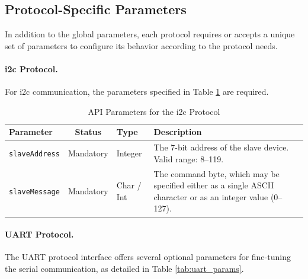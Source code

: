 \subsection{Protocol-Specific Parameters}
\label{subsec:protocol_params}

In addition to the global parameters, each protocol requires or accepts a unique set of parameters to configure its behavior according to the protocol needs.

\paragraph{\gls{i2c} Protocol.} For \gls{i2c} communication, the parameters specified in Table \ref{tab:i2c_params} are required.

\begin{table}[h!]
    \centering
    \caption{API Parameters for the \gls{i2c} Protocol}
    \label{tab:i2c_params}
    \begin{tabular}{|l|c|l|p{6cm}|}
        \hline
        \textbf{Parameter} & \textbf{Status} & \textbf{Type} & \textbf{Description} \\ \hline
        \texttt{slaveAddress} & Mandatory & Integer & The 7-bit address of the slave device. Valid range: 8–119. \\ \hline
        \texttt{slaveMessage} & Mandatory & Char / Int & The command byte, which may be specified either as a single ASCII character or as an integer value (0–127). \\ \hline
    \end{tabular}
\end{table}

\paragraph{UART Protocol.} The UART protocol interface offers several optional parameters for fine-tuning the serial communication, as detailed in Table \ref{tab:uart_params}.

